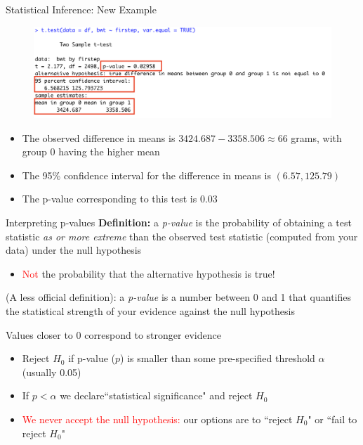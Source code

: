 \documentclass[10pt,t]{beamer}
\begin{document}
\begin{frame}{Statistical Inference: New Example}
\begin{figure}
	\centering \includegraphics[scale=0.5]{ttest4.png}
\end{figure}

\begin{itemize}
	\item The observed difference in means is $3424.687-  3358.506 \approx 66$ grams, with group $0$ having the higher mean
	\item The 95\% confidence interval for the difference in means is $(6.57, 125.79)$
	\item The p-value corresponding to this test is $0.03$
\end{itemize}

\end{frame}


\begin{frame}{Interpreting p-values}
\textbf{Definition:} a \textit{p-value} is the probability of obtaining a test statistic \textit{as or more extreme} than the observed test statistic (computed from your data) under the null hypothesis

\begin{itemize}
	\item[] \textcolor{red}{Not} the probability that the alternative hypothesis is true! 
\end{itemize}

\vspace{0.3cm} 

(A less official definition): a \textit{p-value} is a number between 0 and 1 that quantifies the statistical strength of your evidence against the null hypothesis

\vspace{0.3cm}

Values closer to 0 correspond to stronger evidence
\begin{itemize}
	\item Reject $H_0$ if p-value ($p$) is smaller than some pre-specified threshold $\alpha$ (usually 0.05)
	\item If $p < \alpha$ we declare``statistical significance" and reject $H_0$
	\item \textcolor{red}{We never accept the null hypothesis:} our options are to ``reject $H_0$" or ``fail to reject $H_0$"
\end{itemize}

\end{frame}
\end{document}
